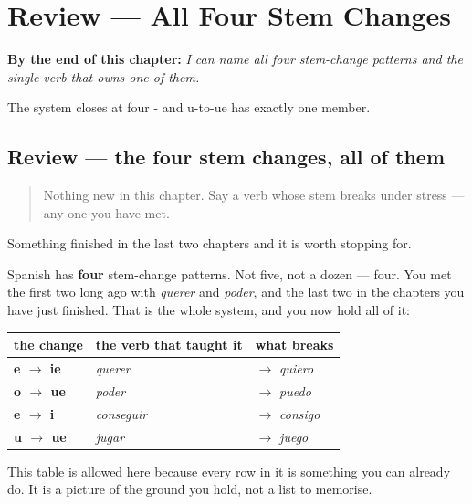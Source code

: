 
\chapter{Review --- All Four Stem Changes}
\label{ch:spanish-review-stem-changes}

\begin{chapteropening}
\textbf{By the end of this chapter:} \emph{I can name all four stem-change patterns and the single verb that owns one of them.}

The system closes at four - and u-to-ue has exactly one member.
\end{chapteropening}

\section[Practice]{Review — the four stem changes, all of them}

\label{lesson:ES-C39-repaso-cambios}



\begin{quote}
Nothing new in this chapter. Say a verb whose stem breaks under stress — any one you have met.
\end{quote}

\begin{grammarlens}[title={What you've built}]
Something finished in the last two chapters and it is worth stopping for.

Spanish has \textbf{four} stem-change patterns. Not five, not a dozen — four. You met the first two long ago with \emph{querer} and \emph{poder}, and the last two in the chapters you have just finished. That is the whole system, and you now hold all of it:

\noindent
\begin{tabularx}{\linewidth}{@{}>{\raggedright\arraybackslash}X>{\raggedright\arraybackslash}X>{\raggedright\arraybackslash}X@{}}
\toprule
\textbf{the change} & \textbf{the verb that taught it} & \textbf{what breaks} \\
\midrule
\textbf{e $\to$ ie} & \emph{querer} & $\to$ \emph{quiero} \\
\textbf{o $\to$ ue} & \emph{poder} & $\to$ \emph{puedo} \\
\textbf{e $\to$ i} & \emph{conseguir} & $\to$ \emph{consigo} \\
\textbf{u $\to$ ue} & \emph{jugar} & $\to$ \emph{juego} \\
\bottomrule
\end{tabularx}

This table is allowed here because every row in it is something you can already do. It is a picture of the ground you hold, not a list to memorise.
\end{grammarlens}

